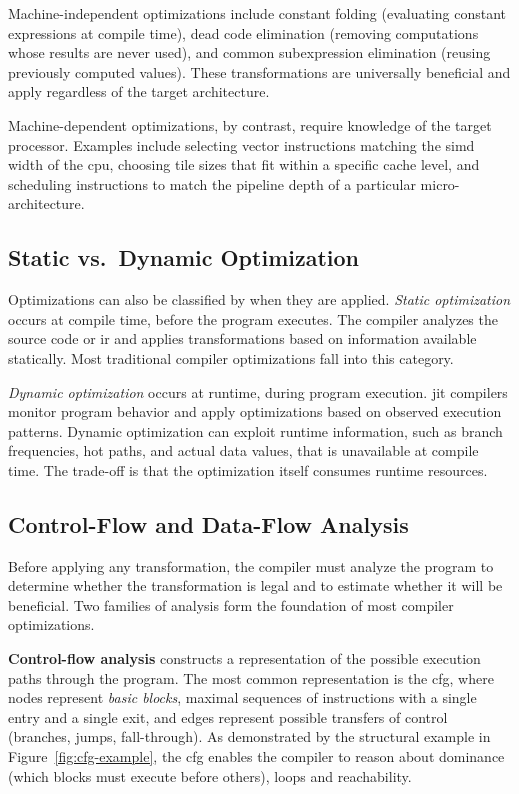 Machine-independent optimizations include constant folding (evaluating constant expressions at compile time), dead code elimination (removing computations whose results are never used), and common subexpression elimination (reusing previously computed values). These transformations are universally beneficial and apply regardless of the target architecture.

Machine-dependent optimizations, by contrast, require knowledge of the target processor. Examples include selecting vector instructions matching the \gls{simd} width of the \gls{cpu}, choosing tile sizes that fit within a specific cache level, and scheduling instructions to match the pipeline depth of a particular micro-architecture.

\newpage
\subsection{Static vs.\ Dynamic Optimization}

Optimizations can also be classified by when they are applied. \textit{Static optimization} occurs at compile time, before the program executes. The compiler analyzes the source code or \gls{ir} and applies transformations based on information available statically. Most traditional compiler optimizations fall into this category.

\textit{Dynamic optimization} occurs at runtime, during program execution. \gls{jit} compilers monitor program behavior and apply optimizations based on observed execution patterns. Dynamic optimization can exploit runtime information, such as branch frequencies, hot paths, and actual data values, that is unavailable at compile time. The trade-off is that the optimization itself consumes runtime resources.

\subsection{Control-Flow and Data-Flow Analysis}

Before applying any transformation, the compiler must analyze the program to determine whether the transformation is legal and to estimate whether it will be beneficial. Two families of analysis form the foundation of most compiler optimizations.

\textbf{Control-flow analysis} constructs a representation of the possible execution paths through the program. The most common representation is the \gls{cfg}, where nodes represent \textit{basic blocks}, maximal sequences of instructions with a single entry and a single exit, and edges represent possible transfers of control (branches, jumps, fall-through). As demonstrated by the structural example in Figure~\ref{fig:cfg-example}, the \gls{cfg} enables the compiler to reason about dominance (which blocks must execute before others), loops and reachability.

